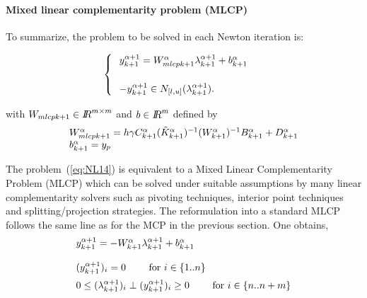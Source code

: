 \paragraph{Mixed linear complementarity problem (MLCP)}To summarize, the problem to be solved in each Newton iteration is:\\{
  \begin{minipage}[l]{1.0\linewidth}
    \begin{equation}
      \begin{cases}
      \begin{array}[l]{l}
        y^{\alpha+1}_{k+1} =   W_{mlcpk+1}^{\alpha}  \lambda^{\alpha+1}_{k+1} + b^{\alpha}_{k+1}
        \\ \\
        -y^{\alpha+1}_{k+1} \in N_{[l,u]}(\lambda^{\alpha+1}_{k+1} ). 
      \end{array}
      \label{eq:NL14}
      \end{cases}
    \end{equation}
  \end{minipage}
}
with $W_{mlcpk+1}\in \mbox{\rm $I\!\!R$}^{m\times m}$ and $b\in\mbox{\rm $I\!\!R$}^{m}$ defined by
\begin{equation}
  \label{eq:NL15}
 \begin{array}[l]{l}
   W_{mlcpk+1}^{\alpha} = h \gamma C^{\alpha}_{k+1} (\tilde K^{\alpha}_{k+1})^{-1} (W^{\alpha}_{k+1})^{-1}  B^{\alpha}_{k+1} + D^{\alpha}_{k+1} \\
   b^{\alpha}_{k+1} = y_p
\end{array}
\end{equation}

The problem~(\ref{eq:NL14}) is equivalent to a Mixed Linear Complementarity Problem (MLCP) which can be solved under suitable assumptions by many linear complementarity solvers such as pivoting techniques, interior point techniques and splitting/projection strategies. The  reformulation into a standard MLCP follows the same line as for the MCP in the previous section. One obtains,
    \begin{equation}
      \begin{array}[l]{l}
        y^{\alpha+1}_{k+1} =   - W^{\alpha}_{k+1}  \lambda^{\alpha+1}_{k+1} + b^{\alpha}_{k+1}
        \\ \\
        (y^{\alpha+1}_{k+1})_i  = 0 \qquad \textrm{ for } i \in \{ 1..n\}\\[2mm]
        0 \leq  (\lambda^{\alpha+1}_{k+1})_i\perp (y^{\alpha+1}_{k+1})_i \geq 0 \qquad \textrm{ for } i \in \{ n..n+m\}\\
      \end{array}
      \label{eq:MLCP1} 
    \end{equation}




